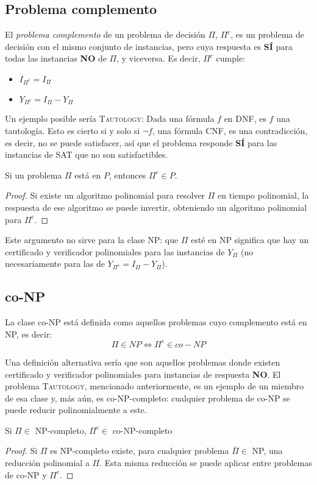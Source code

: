 \subsection{Problema complemento}

El \textit{problema complemento} de un problema de decisión $\Pi$, $\Pi^c$, es un problema de decisión con el mismo conjunto de instancias, pero cuya respuesta es \textbf{SÍ} para todas las instancias \textbf{NO} de $\Pi$, y viceversa. Es decir, $\Pi^c$ cumple:
\begin{itemize}
    \item $I_{\Pi^c} = I_{\Pi}$
    \item $Y_{\Pi^c} = I_{\Pi} - Y_{\Pi}$
\end{itemize}

Un ejemplo posible sería \textsc{Tautology}: Dada una fórmula $f$ en DNF, es $f$ una tautología. Esto es cierto si y solo si $\neg f$, una fórmula CNF, es una contradicción, es decir, no se puede satisfacer, así que el problema responde \textbf{SÍ} para las instancias de \textsc{SAT} que no son satisfactibles.

\begin{theorem*}
    Si un problema $\Pi$ está en $P$, entonces $\Pi^c \in P$.
\end{theorem*}
\begin{proof}
    Si existe un algoritmo polinomial para resolver $\Pi$ en tiempo polinomial, la respuesta de ese algoritmo se puede invertir, obteniendo un algoritmo polinomial para $\Pi^c$.
\end{proof}

Este argumento no sirve para la clase NP: que $\Pi$ esté en NP significa que hay un certificado y verificador polinomiales para las instancias de $Y_{\Pi}$ (no necesariamente para las de $Y_{\Pi^c} = I_{\Pi} - Y_{\Pi}$).

\subsection{co-NP}

La clase co-NP está definida como aquellos problemas cuyo complemento está en NP, es decir:
$$\Pi \in NP \iff \Pi^c \in co-NP$$

Una definición alternativa sería que son aquellos problemas donde existen certificado y verificador polinomiales para instancias de respuesta \textbf{NO}. El problema \textsc{Tautology}, mencionado anteriormente, es un ejemplo de un miembro de esa clase y, más aún, es co-NP-completo: cualquier problema de co-NP se puede reducir polinomialmente a este.

\begin{theorem*}
    Si $\Pi \in$ NP-completo, $\Pi^c \in$ co-NP-completo
\end{theorem*}
\begin{proof}
    Si $\Pi$ es NP-completo existe, para cualquier problema $\bar{\Pi} \in$ NP, una reducción polinomial a $\Pi$. Esta misma reducción se puede aplicar entre problemas de co-NP y $\Pi^c$.
\end{proof}
